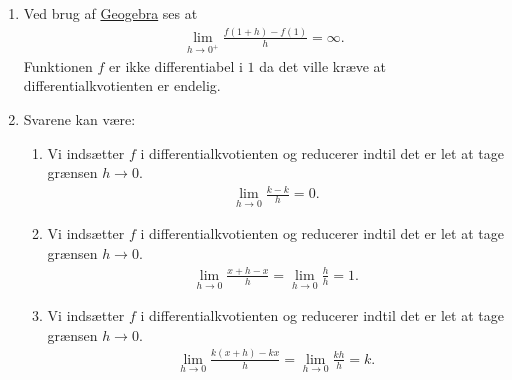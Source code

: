 \begin{enumerate}
	
	\item Ved brug af \href{https://www.geogebra.org/m/eTmzBFEq}{Geogebra} ses at
	\begin{align*}
	\lim_{h\to 0^+} \frac{f(1+h)-f(1)}{h}= \infty.
	\end{align*}
	Funktionen $f$ er ikke differentiabel i $1$ da det ville kræve at differentialkvotienten er endelig.
	
	\item Svarene kan være:
	\begin{enumerate}
		\item Vi indsætter $f$ i differentialkvotienten og reducerer indtil det er let at tage grænsen $h\to 0$.
		\begin{align*}
		\lim_{h\to 0}\frac{k-k}{h}=0.
		\end{align*}
		\item Vi indsætter $f$ i differentialkvotienten og reducerer indtil det er let at tage grænsen $h\to 0$.
		\begin{align*}
		\lim_{h\to 0}\frac{x+h-x}{h}=\lim_{h\to 0}\frac{h}{h}=1.
		\end{align*}
		\item Vi indsætter $f$ i differentialkvotienten og reducerer indtil det er let at tage grænsen $h\to 0$.
		\begin{align*}
		\lim_{h\to 0}\frac{k(x+h)-kx}{h}=\lim_{h\to 0}\frac{kh}{h}=k.
		\end{align*}
	\end{enumerate}
	

\end{enumerate}
